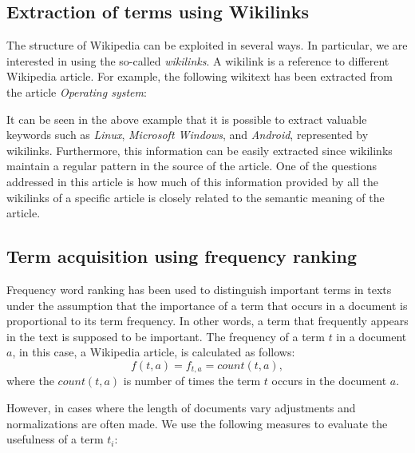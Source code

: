 \documentclass[oribibl]{llncs}
\begin{document}
\subsection{Extraction of terms using Wikilinks} \label{subsec:wikilinks}

The structure of Wikipedia can be exploited in several ways. In particular, we are interested in using the so-called {\it wikilinks}. A wikilink is a reference to different Wikipedia article. For example, the following wikitext has been extracted from the article {\it Operating system}: 

\begin{center}
\end{center}

It can be seen in the above example that it is possible to extract valuable keywords such as {\it Linux}, {\it Microsoft Windows}, and {\it Android}, represented by wikilinks. Furthermore, this information can be easily extracted since wikilinks maintain a regular pattern in the source of the article. One of the questions addressed in this article is how much of this information provided by all the wikilinks of a specific article is closely related to the semantic meaning of the article. 

\subsection{Term acquisition using frequency ranking} \label{subsec:frequency}

Frequency word ranking has been used to distinguish important terms in texts under the assumption that the importance of a term that occurs in a document is proportional to its term frequency. In other words, a term that frequently appears in the text is supposed to be important. The frequency of a term $t$ in a document $a$, in this case, a Wikipedia article, is calculated as follows:
\[
f(t,a) = f_{t,a} = count(t, a),
\]where the $count(t, a)$ is number of times the term $t$ occurs in the document $a$.

However, in cases where the length of documents vary adjustments and normalizations are often made. We use the following measures to evaluate the usefulness of a term $t_i$:
\end{document}
